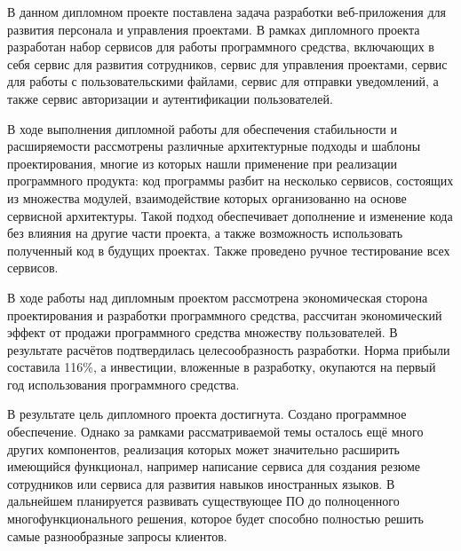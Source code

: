 
В данном дипломном проекте поставлена задача разработки веб-при\-ложения для развития персонала и управления проектами. В рамках дипломного проекта разработан набор сервисов для работы программного средства, включающих в себя сервис для развития сотрудников, сервис для управления проектами, сервис для работы с пользовательскими файлами, сервис для отправки уведомлений, а также сервис авторизации и аутентификации пользователей.

В ходе выполнения дипломной работы для обеспечения стабильности и расширяемости рассмотрены различные архитектурные подходы и шаблоны проектирования, многие из которых нашли применение при реализации программного продукта: код программы разбит на несколько сервисов, состоящих из множества модулей, взаимодействие которых организованно на основе сервисной архитектуры. Такой подход обеспечивает дополнение и изменение кода без влияния на другие части проекта, а также возможность использовать полученный код в будущих проектах. Также проведено ручное тестирование всех сервисов.

В ходе работы над дипломным проектом рассмотрена экономическая сторона проектирования и разработки программного средства, рассчитан экономический эффект от продажи программного средства множеству пользователей. В результате расчётов подтвердилась целесообразность разработки. Норма прибыли составила 116\%, а инвестиции, вложенные в разработку, окупаются на первый год использования программного средства.

В результате цель дипломного проекта достигнута. Создано программное обеспечение. Однако за рамками рассматриваемой темы осталось ещё много других компонентов, реализация которых может значительно расширить имеющийся функционал, например написание сервиса для создания резюме сотрудников или сервиса для развития навыков иностранных языков. В дальнейшем планируется развивать существующее ПО до полноценного многофункционального решения, которое будет способно полностью решить самые разнообразные запросы клиентов.
